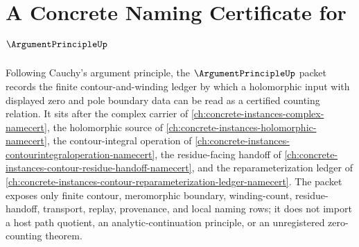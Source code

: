 \chapter{A Concrete Naming Certificate for $\ArgumentPrincipleUp$}
\label{ch:concrete-instances-argument-principle-namecert}

Following Cauchy's argument principle, the $\ArgumentPrincipleUp$ packet records the finite contour-and-winding ledger by which a holomorphic input with displayed zero and pole boundary data can be read as a certified counting relation. It sits after the complex carrier of \autoref{ch:concrete-instances-complex-namecert}, the holomorphic source of \autoref{ch:concrete-instances-holomorphic-namecert}, the contour-integral operation of \autoref{ch:concrete-instances-contourintegraloperation-namecert}, the residue-facing handoff of \autoref{ch:concrete-instances-contour-residue-handoff-namecert}, and the reparameterization ledger of \autoref{ch:concrete-instances-contour-reparameterization-ledger-namecert}. The packet exposes only finite contour, meromorphic boundary, winding-count, residue-handoff, transport, replay, provenance, and local naming rows; it does not import a host path quotient, an analytic-continuation principle, or an unregistered zero-counting theorem.

